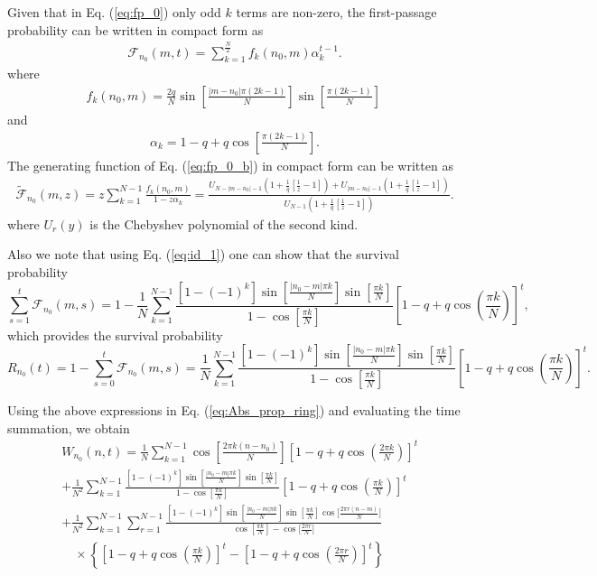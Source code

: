 \documentclass[10pt, hidelinks, superscriptaddress, amsmath, amssymb, aps, pre]{revtex4-2}
\begin{document}
Given that in Eq. (\ref{eq:fp_0}) only odd $k$ terms are non-zero, the first-passage probability can be written in compact form as
\begin{align}
\mathcal{F}_{n_0}(m,t)=\sum_{k=1}^{\frac{N}{2}}f_{k}(n_0,m)\alpha_k^{t-1}.
\label{eq:fp_0_b}
\end{align}
where
\begin{align}
f_k(n_0,m)=\frac{2q}{N}\sin\left[\frac{|m-n_0|\pi (2k-1)}{N}\right]\sin\left[\frac{\pi (2k-1)}{N}\right]\,
\label{eq:fn0m}
\end{align}
and
\begin{align}
\alpha_{k}=1-q+q\cos\left[\frac{\pi(2k-1)}{N}\right].
\label{eq:alpha_k}
\end{align}
The generating function of Eq. (\ref{eq:fp_0_b}) in compact form can be written as
\begin{align}
\widetilde{\mathcal{F}}_{n_0}(m,z)=z\sum_{k=1}^{N-1}\frac{f_k(n_0,m)}{1-z\alpha_k}=\frac{U_{N-|m-n_0|-1}\left(1+\frac{1}{q}\left[\frac{1}{z}-1\right]\right)+U_{|m-n_0|-1}\left(1+\frac{1}{q}\left[\frac{1}{z}-1\right]\right)}{U_{N-1}\left(1+\frac{1}{q}\left[\frac{1}{z}-1\right]\right)}.
\label{eq:fp_0_z}
\end{align}
where $U_r(y)$ is the Chebyshev polynomial of the second kind.


Also we note that using Eq. (\ref{eq:id_1}) one can show that the survival probability $$\sum_{s=1}^t \mathcal{F}_{n_0}(m,s)=1-\frac{1}{N}\sum_{k=1}^{N-1}\frac{\left[1-(-1)^k\right]\sin\left[\frac{|n_0-m|\pi k}{N}\right]\sin\left[\frac{\pi k}{N}\right]}{1-\cos\left[\frac{\pi k}{N}\right]}\left[1-q+q\cos\left(\frac{\pi k}{N}\right)\right]^{t},$$ which provides the survival probability $$R_{n_0}(t)=1-\sum_{s=0}^t \mathcal{F}_{n_0}(m,s)=\frac{1}{N}\sum_{k=1}^{N-1}\frac{\left[1-(-1)^k\right]\sin\left[\frac{|n_0-m|\pi k}{N}\right]\sin\left[\frac{\pi k}{N}\right]}{1-\cos\left[\frac{\pi k}{N}\right]}\left[1-q+q\cos\left(\frac{\pi k}{N}\right)\right]^{t}.$$

Using the above expressions in Eq. (\ref{eq:Abs_prop_ring}) and evaluating the time summation, we obtain
\begin{align}
&W_{n_0}(n,t)=\frac{1}{N}\sum_{k=1}^{N-1}\cos\left[\frac{2\pi k (n-n_0)}{N}\right]\left[1-q+q\cos\left(\frac{2\pi k}{N}\right)\right]^t\nonumber \\
&+\frac{1}{N^2}\sum_{k=1}^{N-1}\frac{\left[1-(-1)^k\right]\sin\left[\frac{|n_0-m|\pi k}{N}\right]\sin\left[\frac{\pi k}{N}\right]}{1-\cos\left[\frac{\pi k}{N}\right]}\left[1-q+q\cos\left(\frac{\pi k}{N}\right)\right]^{t}\nonumber \\
&+\frac{1}{N^2}\sum_{k=1}^{N-1}\sum_{r=1}^{N-1}
\frac{\left[1-(-1)^k\right]\sin\left[\frac{|n_0-m|\pi k}{N}\right]\sin\left[\frac{\pi k}{N}\right]\cos\Big[\frac{2\pi r (n-m)}{N}\Big]}
{\cos\left[\frac{\pi k}{N}\right]-\cos\Big[\frac{2\pi r}{N}\Big]}
\nonumber\\
&\quad\times
\left\{\left[1-q+q\cos\left(\frac{\pi k}{N}\right)\right]^t
-\left[1-q+q\cos\left(\frac{2\pi r}{N}\right)\right]^t\right\}
\end{align}
\end{document}
